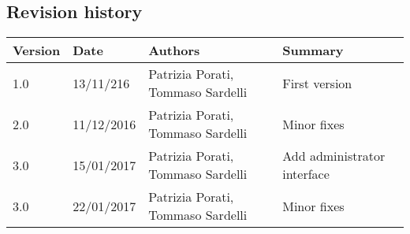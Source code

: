 \subsection{Revision history}
\begin{tabular}{|l|l|l|l|}
	\hline
	\textbf{Version}	& \textbf{Date}	& \textbf{Authors}	& \textbf{Summary}\\
	\hline
	1.0 	& 13/11/216 	& Patrizia Porati, Tommaso Sardelli 	& First version\\
	\hline
	2.0 	& 11/12/2016 	& Patrizia Porati, Tommaso Sardelli 	& Minor fixes\\
	\hline
	3.0		& 15/01/2017 	& Patrizia Porati, Tommaso Sardelli 	& Add administrator interface\\
	\hline
	3.0 	& 22/01/2017 	& Patrizia Porati, Tommaso Sardelli 	& Minor fixes\\
	\hline
\end{tabular}